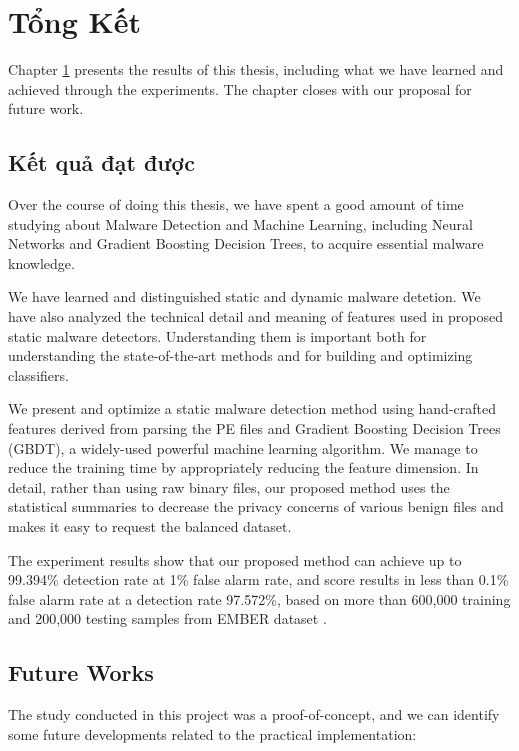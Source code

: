 \chapter{Tổng Kết} 
\label{chap:conclusion}

\begin{chapabstract}
Chapter \ref{chap:conclusion} presents the results of this thesis, including what we have learned and achieved through the experiments. The chapter closes with our proposal for future work.
\end{chapabstract}

\section{Kết quả đạt được}

Over the course of doing this thesis, we have spent a good amount of time studying about Malware Detection and Machine Learning, including Neural Networks and Gradient Boosting Decision Trees, to acquire essential malware knowledge. 

We have learned and distinguished static and dynamic malware detetion. We have also analyzed the technical detail and meaning of features used in proposed static malware detectors. Understanding them is important both for understanding the state-of-the-art methods and for building and optimizing classifiers.

We present and optimize a static malware detection method using hand-crafted features derived from parsing the PE files and Gradient Boosting Decision Trees (GBDT), a widely-used powerful machine learning algorithm.
We manage to reduce the training time by appropriately reducing the feature dimension. 
In detail, rather than using raw binary files, our proposed method uses the statistical summaries to decrease the privacy concerns of various benign files and makes it easy to request the balanced dataset. 

The experiment results show that our proposed method can achieve up to 99.394\% detection rate at 1\% false alarm rate, and score results in less than 0.1\% false alarm rate at a detection rate 97.572\%, based on more than 600,000 training and 200,000 testing samples from EMBER dataset \cite{anderson2018ember}.

\section{Future Works}

The study conducted in this project was a proof-of-concept, and we can identify some future developments related to the practical implementation:

